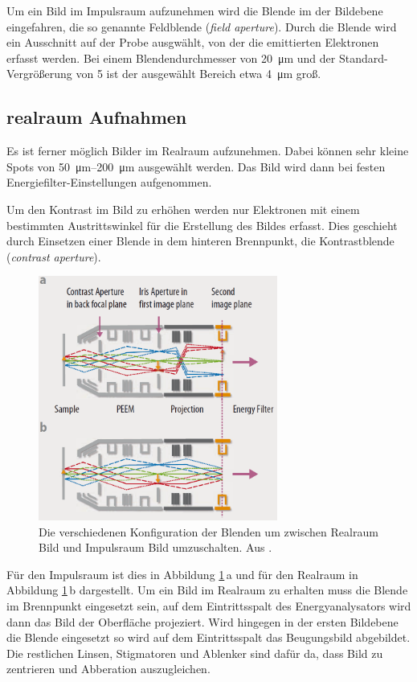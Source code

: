         Um ein Bild im Impulsraum aufzunehmen wird die Blende im der Bildebene eingefahren, die so genannte Feldblende (\textit{field aperture}).
        Durch die Blende wird ein Ausschnitt auf der Probe ausgwählt, von der die emittierten Elektronen erfasst werden.
        Bei einem Blendendurchmesser von \SI{20}{\micro\meter} und der Standard-Vergrößerung von \num{5} ist der ausgewählt Bereich etwa \SI{4}{\micro\meter} groß.

        \subsection{realraum Aufnahmen}
        Es ist ferner möglich Bilder im Realraum aufzunehmen. 
        Dabei können sehr kleine Spots von \SIrange[range-pharse=' bis ']{50}{200}{\micro\meter} ausgewählt werden.
        Das Bild wird dann bei festen Energiefilter-Einstellungen aufgenommen.

        Um den Kontrast im Bild zu erhöhen werden nur Elektronen mit einem bestimmten Austrittswinkel für die Erstellung des Bildes erfasst.
        Dies geschieht durch Einsetzen einer Blende in dem hinteren Brennpunkt, die Kontrastblende (\textit{contrast aperture}).



        \begin{figure}
            \centering
            \includegraphics[width=0.7\textwidth]{./content/Real_k.PNG}
            \caption{Die verschiedenen Konfiguration der Blenden um zwischen Realraum Bild und Impulsraum Bild umzuschalten. Aus \cite{Focus}.}
            \label{fig:real_k}
        \end{figure}
        Für den Impulsraum ist dies in Abbildung \ref{fig:real_k}\,a und für den Realraum in Abbildung \ref{fig:real_k}\,b dargestellt.
        Um ein Bild im Realraum zu erhalten muss die Blende im Brennpunkt eingesetzt sein, auf dem Eintrittsspalt des Energyanalysators wird dann das Bild der Oberfläche projeziert.
        Wird hingegen in der ersten Bildebene die Blende eingesetzt so wird auf dem Eintrittsspalt das Beugungsbild abgebildet. 
        Die restlichen Linsen, Stigmatoren und Ablenker sind dafür da, dass Bild zu zentrieren und Abberation auszugleichen.

